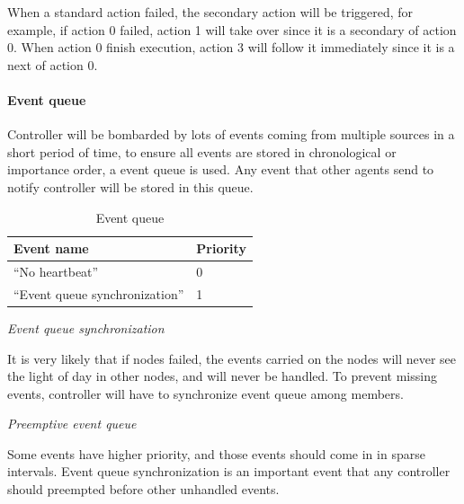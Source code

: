 When a standard action failed, the secondary action will be triggered, for example, if action 0 failed, action 1 will take over since it is a secondary of action 0. When action 0 finish execution, action 3 will follow it immediately since it is a next of action 0.

\paragraph{Event queue}

Controller will be bombarded by lots of events coming from multiple sources in a short period of time, to ensure all events are stored in chronological or importance order, a event queue is used. Any event that other agents send to notify controller will be stored in this queue.

\begin{table}[h!]
\begin{center}
\begin{tabular}{ll}
Event name & Priority \\
\hline
“No heartbeat” & 0 \\
“Event queue synchronization” & 1 \\
\end{tabular}
\end{center}
\caption{Event queue}
\end{table}



\emph{Event queue synchronization}

It is very likely that if nodes failed, the events carried on the nodes will never see the light of day in other nodes, and will never be handled. To prevent missing events, controller will have to synchronize event queue among members.

\emph{Preemptive event queue}

Some events have higher priority, and those events should come in in sparse intervals. Event queue synchronization is an important event that any controller should preempted before other unhandled events.

